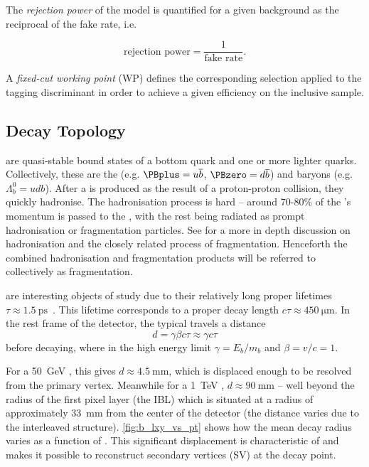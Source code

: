 The \textit{rejection power} of the model is quantified for a given background as the reciprocal of the fake rate, i.e.

\begin{equation}
\text{rejection power} = \frac{1}{\text{fake rate}} .
\end{equation}

A \textit{fixed-cut working point} (WP) defines the corresponding selection applied to the tagging discriminant in order to achieve a given efficiency on the inclusive \ttbar sample.


\subsection{Decay Topology}
\label{sec:b_decay_topology}

\bhadrons are quasi-stable bound states of a bottom quark and one or more lighter quarks.
Collectively, these are the \bmesons (e.g. $\PBplus = u \overline{b}$, $\PBzero = d \overline{b}$) and baryons (e.g. $\Lambda_b^0 = udb$).
After a \bquark is produced as the result of a proton-proton collision, they quickly hadronise.
The hadronisation process is hard -- around 70-80\% of the \bquark's momentum is passed to the \bhadron, with the rest being radiated as prompt hadronisation or fragmentation particles.
See  for a more in depth discussion on hadronisation and the closely related process of fragmentation.
Henceforth the combined hadronisation and fragmentation products will be referred to collectively as fragmentation.

\bhadrons are interesting objects of study due to their relatively long proper lifetimes $\tau \approx \SI{1.5}{\pico\second}$~\cite{PhysRevD.98.030001}.
This lifetime corresponds to a proper decay length $c \tau \approx \SI{450}{\micro\meter}$.
In the rest frame of the detector, the typical \bhadron travels a distance 
%
\begin{equation}
  d = \gamma \beta c \tau \approx \gamma c \tau
\end{equation}
%
before decaying, where in the high energy limit $\gamma = E_b/m_b$ and $\beta = v/c = 1$.

For a \SI{50}{\GeV} \bhadron, this gives $d \approx \SI{4.5}{\milli\meter}$, which is displaced enough to be resolved from the primary vertex.
Meanwhile for a \SI{1}{\TeV} \bhadron, $d \approx \SI{90}{\milli\meter}$ -- well beyond the radius of the first pixel layer (the IBL) which is situated at a radius of approximately \SI{33}{\milli\meter} from the center of the detector (the distance varies due to the interleaved structure).
\cref{fig:b_lxy_vs_pt} shows how the mean decay radius varies as a function of \bhadron \pt.
This significant displacement is characteristic of \bjets and makes it possible to reconstruct secondary vertices (SV) at the \bhadron decay point.

